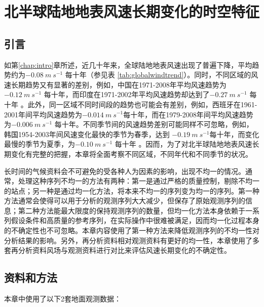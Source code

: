 \chapter{北半球陆地地表风速长期变化的时空特征}\label{chap:SpatiotemporalCharacteristics}

\section{引言}

如第\ref{chap:intro}章所述，近几十年来，全球陆地地表风速出现了普遍下降，平均趋势约为$-0.08 ~ m ~ s^{-1}$ 每十年（参见表  \ref{tab:globalwindtrend}）。同时，不同区域的风速长期趋势又有显著的差别，例如，中国在1971-2008年平均风速趋势为$ -0.12 ~ m ~ s^{-1} $ 每十年\citep{yin2010determining}，而印度在1971-2002年平均风速趋势却达到了$ -0.27 ~ m ~ s^{-1}$ 每十年 \citep{mcvicar2012global}。此外，同一区域不同时间段的趋势也可能会有差别，例如，西班牙在1961-2001年间平均风速趋势为$ -0.014 ~ m ~ s^{-1}$每十年，而在1979-2008年间平均风速趋势为$ -0.006 ~ m ~ s^{-1}$ 每十年\citep{azorinmolina2014homogenization}。不同季节间的风速趋势差别可能同样不可忽略，例如，韩国1954-2003年间风速变化最快的季节为春季，达到 $-0.19 ~ m ~ s^{-1}$每十年，而变化最慢的季节为夏季，为$-0.10 ~ m ~ s^{-1}$ 每十年 \citep{kim2015recent}。因而，为了对北半球陆地地表风速长期变化有完整的把握，本章将全面考察不同区域，不同年代和不同季节的状况。

长时间的气候资料会不可避免的受各种人为因素的影响，出现不均一的情况。通常，处理这种序列不均一的方法有两种：第一是通过严格的质量控制，剔除不均一的站点\citep{vautard2010northern, zeng2019a}；另一种是通过均一化方法，将本来不均一的序列变为均一的序列\citep{wan2010homogenization, azorinmolina2014homogenization}。第一种方法通常会使得可以用于分析的观测序列大大减少，但保存了原始观测序列的信息；第二种方法能最大限度的保持观测序列的数量，但均一化方法本身依赖于一系列假设条件和高质量的参考序列，在实际操作中很难被满足，因而均一化过程本身的不确定性也不可忽略。本章内容使用了第一种方法来降低观测序列的不均一性对分析结果的影响。另外，再分析资料相对观测资料有更好的均一性，本章使用了多套再分析资料风场与观测资料进行对比来评估风速长期变化的不确定性。

\section{资料和方法}

本章中使用了以下2套地面观测数据：

